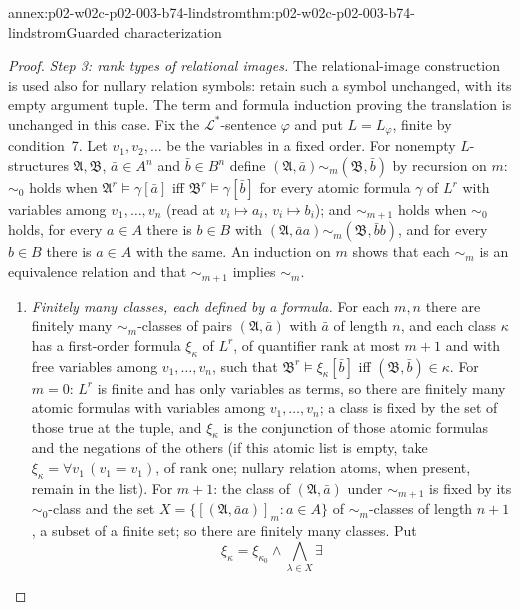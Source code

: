 \begin{annexitem}{annex:p02-w02c-p02-003-b74-lindstrom}{thm:p02-w02c-p02-003-b74-lindstrom}{Guarded characterization}
\begin{proof}
\emph{Step 3: rank types of relational images.} The relational-image
construction is used also for nullary relation symbols: retain such a
symbol unchanged, with its empty argument tuple. The term and formula
induction proving the translation is unchanged in this case. Fix the
\(\mathcal L^{\ast}\)-sentence \(\varphi\) and put \(L=L_\varphi\), finite by
condition~7.  Let \(v_1,v_2,\ldots\) be the variables in a fixed order.  For
nonempty \(L\)-structures \(\mathfrak A,\mathfrak B\), \(\bar a\in A^{n}\) and
\(\bar b\in B^{n}\) define \((\mathfrak A,\bar a)\sim_m(\mathfrak B,\bar b)\)
by recursion on \(m\): \(\sim_0\) holds when \(\mathfrak A^{r}\models
\gamma[\bar a]\) iff \(\mathfrak B^{r}\models\gamma[\bar b]\) for every
atomic formula \(\gamma\) of \(L^{r}\) with variables among
\(v_1,\ldots,v_n\) (read at \(v_i\mapsto a_i\), \(v_i\mapsto b_i\)); and
\(\sim_{m+1}\) holds when \(\sim_0\) holds, for every \(a\in A\) there is
\(b\in B\) with \((\mathfrak A,\bar aa)\sim_m(\mathfrak B,\bar bb)\), and for
every \(b\in B\) there is \(a\in A\) with the same.  An induction on \(m\)
shows that each \(\sim_m\) is an equivalence relation and that
\(\sim_{m+1}\) implies \(\sim_m\).
\begin{enumerate}
\item[(3a)] \emph{Finitely many classes, each defined by a formula.}  For
      each \(m,n\) there are finitely many \(\sim_m\)-classes of pairs
      \((\mathfrak A,\bar a)\) with \(\bar a\) of length \(n\), and each class
      \(\kappa\) has a first-order formula \(\xi_\kappa\) of \(L^{r}\), of
      quantifier rank at most \(m+1\) and with free variables among
      \(v_1,\ldots,v_n\), such that \(\mathfrak B^{r}\models\xi_\kappa[\bar
      b]\) iff \((\mathfrak B,\bar b)\in\kappa\).  For \(m=0\): \(L^{r}\) is
      finite and has only variables as terms, so there are finitely many
      atomic formulas with variables among \(v_1,\ldots,v_n\); a class is
      fixed by the set of those true at the tuple, and \(\xi_\kappa\) is the
      conjunction of those atomic formulas and the negations of the others
      (if this atomic list is empty, take
      \(\xi_\kappa=\forall v_1\,(v_1=v_1)\), of rank one;
      nullary relation atoms, when present, remain in the list).  For \(m+1\): the class of
      \((\mathfrak A,\bar a)\) under \(\sim_{m+1}\) is fixed by its
      \(\sim_0\)-class and the set
      \(X=\{[(\mathfrak A,\bar aa)]_m:a\in A\}\) of \(\sim_m\)-classes of
      length \(n+1\), a subset of a finite set; so there are finitely many
      classes.  Put
      \[
       \xi_\kappa=\xi_{\kappa_0}\land\bigwedge_{\lambda\in X}\exists
\]
\end{enumerate}
\end{proof}
\end{annexitem}

